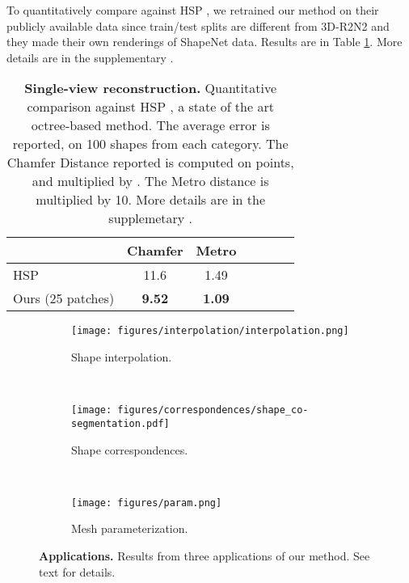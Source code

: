 \documentclass[10pt,twocolumn,letterpaper]{article}
\begin{document}
To quantitatively compare against HSP \cite{Hane:2017}, we retrained our method on their publicly available data since train/test splits are different from 3D-R2N2 \cite{choy20163d} and they made their own renderings of ShapeNet data. Results are in Table \ref{tab:hsp_compare}. More details are in the supplementary \cite{appendix}.
\setlength{\belowcaptionskip}{2pt}

\begin{table}[h!]
\centering
\begin{tabular}{l|c|c|c|c|c|c}
 & \multicolumn{1}{|l|}{Chamfer} & \multicolumn{1}{|l|}{Metro} \\
\hline
HSP  \cite{Hane:2017} & 11.6 &  1.49\\
Ours  (25 patches)  & \textbf{9.52} &  \textbf{1.09} \\
 \end{tabular}
 \medskip
  \caption{{\bf Single-view reconstruction.} Quantitative comparison against HSP \cite{Hane:2017}, a state of the art octree-based method. The average error is reported, on 100 shapes from each category. The Chamfer Distance reported is computed on  points, and multiplied by . The Metro distance is multiplied by 10. More details are in the supplemetary \cite{appendix}.}\label{tab:hsp_compare}
    \vspace{-3mm}
\end{table}




\begin{figure*}[t!]
\centering
\begin{subfigure}[b]{0.32\linewidth}
 \texttt{[image: figures/interpolation/interpolation.png]}
\caption{Shape interpolation. \label{fig:interpolation}}
\end{subfigure}
~\vline~
\begin{subfigure}[b]{0.32\linewidth}
 \texttt{[image: figures/correspondences/shape\_co-segmentation.pdf]}
\caption{Shape correspondences. \label{fig:corresp}}
\end{subfigure}
~\vline~
\begin{subfigure}[b]{0.32\linewidth}
 \texttt{[image: figures/param.png]}
\caption{Mesh parameterization. \label{fig:mesh_parameterization}}
\end{subfigure}
\caption{{\bf Applications.} Results from three applications of our method. See text for details.
}
\vspace{-10pt}

  \label{fig:applications}
\end{figure*}
\end{document}
